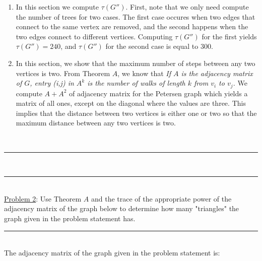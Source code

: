 \documentclass{article}
\newcommand{\problemsep}{\leavevmode\\[0.05in] \rule[\baselineskip/4]{\textwidth}{1pt} \\[0.005in] \rule[\baselineskip]{\textwidth}{1pt}\vspace{-\baselineskip}\leavevmode\\[0.05in]}
\newcommand{\statementsep}{\leavevmode\\[0.005in] \rule[\baselineskip/4]{\textwidth}{0.4pt}\leavevmode\\[0.005in]}
\begin{document}
\begin{enumerate}
	\item In this section we compute $\tau(G'')$.  First, note that we only need compute the number of trees for two cases.  The first case occures when two edges that connect to the same vertex are removed, and the second happens when the two edges connect to different vertices. Computing $\tau(G'')$ for the first yields $\tau(G'') = 240$, and $\tau(G'')$ for the second case is equal to $300$.
	\item In this section, we show that the maximum number of steps between any two vertices is two.  From Theorem $A$, we know that {\it If $A$ is the adjacency matrix of $G$, entry (i,j) in $A^k$ is the number of walks of length $k$ from $v_i$ to $v_j$.} We compute $A + A^2$ of adjacency matrix for the Petersen graph which yields a matrix of all ones, except on the diagonal where the values are three.  This implies that the distance between two vertices is either one or two so that the maximum distance between any two vertices is two.
\end{enumerate}
\problemsep
\noindent\underline{Problem 2}: 
Use Theorem $A$ and the trace of the appropriate power of the adjacency matrix of the graph below to determine how many "triangles" the graph given in the problem statement has.
\statementsep
The adjacency matrix of the graph given in the problem statement is:
\end{document}
